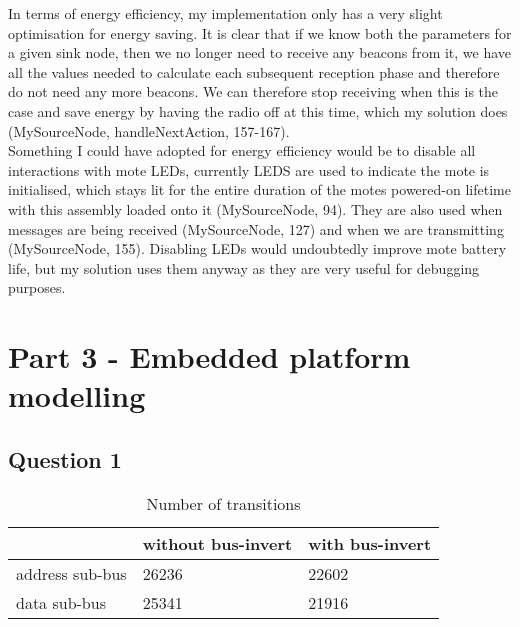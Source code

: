 \documentclass[12pt]{article} %
\begin{document}
In terms of energy efficiency, my implementation only has a very slight optimisation for energy saving. It is clear that if we know both the parameters for a given sink node, then we no longer need to receive any beacons from it, we have all the values needed to calculate each subsequent reception phase and therefore do not need any more beacons. We can therefore stop receiving when this is the case and save energy by having the radio off at this time, which my solution does (MySourceNode, handleNextAction, 157-167).
\\

Something I could have adopted for energy efficiency would be to disable all interactions with mote LEDs, currently LEDS are used to indicate the mote is initialised, which stays lit for the entire duration of the motes powered-on lifetime with this assembly loaded onto it (MySourceNode, 94). They are also used when messages are being received (MySourceNode, 127) and when we are transmitting (MySourceNode, 155). Disabling LEDs would undoubtedly improve mote battery life, but my solution uses them anyway as they are very useful for debugging purposes.



\section{Part 3 - Embedded platform modelling}

\subsection{Question 1}

\begin{table}[H]
\centering
\caption{Number of transitions}
\label{my-label}
\begin{tabular}{|l|l|l|}
\hline
                & without bus-invert & with bus-invert \\ \hline
address sub-bus & 26236              & 22602           \\ \hline
data sub-bus    & 25341              & 21916           \\ \hline
\end{tabular}
\end{table}
\end{document}
